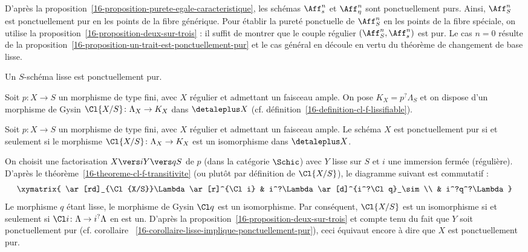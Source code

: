 \documentclass[10pt]{../fichiers-configuration-latex/smfart}
\begin{document}
D'après la proposition~\ref{16-proposition-purete-egale-caracteristique}, les
schémas $\Aff^n_s$ et $\Aff^n_\eta$ sont ponctuellement purs. Ainsi,
$\Aff^n_S$ est ponctuellement pur en les points de la fibre générique.
Pour établir la pureté ponctuelle de $\Aff^n_S$ en les
points de la fibre spéciale, on utilise la
proposition~\ref{16-proposition-deux-sur-trois} : il suffit de montrer que
le couple régulier $(\Aff^n_S,\Aff^n_s)$ est pur.
Le cas $n=0$ résulte de la
proposition~\ref{16-proposition-un-trait-est-ponctuellement-pur} et le cas
général en découle en vertu du théorème de changement de base lisse.

\begin{corollaire2}\label{16-corollaire-lisse-implique-ponctuellement-pur}
Un $S$-schéma lisse est ponctuellement pur.
\end{corollaire2}

\begin{definition2}
Soit $p\colon X\to S$ un morphisme de type fini, avec $X$
régulier et admettant un faisceau ample.
On pose $K_X=p^?\Lambda_S$ et on dispose d'un morphisme de
Gysin $\Cl{X/S} \colon \Lambda_X\to K_X$ dans $\detaleplus X$
(cf. définition~\ref{16-definition-cl-f-lissifiable}).
\end{definition2}

\begin{proposition2}
Soit $p\colon X\to S$ un morphisme de type fini, avec $X$
régulier et admettant un faisceau ample.
Le schéma $X$ est ponctuellement pur si et seulement si le morphisme
$\Cl{X/S}\colon \Lambda_X\to K_X$ est un isomorphisme dans $\detaleplus X$.
\end{proposition2}

On choisit une factorisation $X\vers i Y \vers q S$ de $p$ (dans la
catégorie $\Schic$) avec $Y$ lisse
sur $S$ et $i$ une immersion fermée (régulière). D'après le
théorème~\ref{16-theoreme-cl-f-transitivite} (ou plutôt par définition de
$\Cl{X/S}$), le diagramme suivant est
commutatif :
\[
\xymatrix{
\ar[rd]_{\Cl{X/S}}\Lambda\ar[r]^{\Cl i} & i^?\Lambda
\ar[d]^{i^?\Cl q}_\sim\\
& i^?q^?\Lambda}
\]
Le morphisme $q$ étant lisse, le morphisme de Gysin $\Cl q$ est un
isomorphisme. Par conséquent, $\Cl {X/S}$ est un isomorphisme si et
seulement si $\Cl i\colon \Lambda\to i^?\Lambda$ en est un. D'après la
proposition~\ref{16-proposition-deux-sur-trois} et compte tenu du fait que $Y$
soit ponctuellement pur (cf. corollaire~%
\ref{16-corollaire-lisse-implique-ponctuellement-pur}), ceci équivaut encore
à dire que $X$ est ponctuellement pur.
\end{document}
